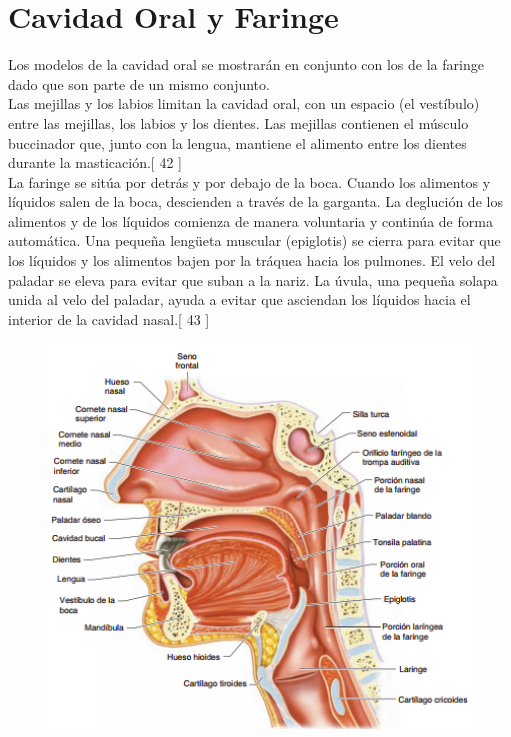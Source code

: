 \section{Cavidad Oral y Faringe}
Los modelos de la cavidad oral se mostrarán en conjunto con los de la faringe dado que son parte de un mismo conjunto.\\
Las mejillas y los labios limitan la cavidad oral, con un espacio (el vestíbulo) entre las mejillas, los labios y los dientes. Las mejillas contienen 
el músculo buccinador que, junto con la lengua, mantiene el alimento entre los dientes durante la masticación.[ 42 ]\\
La faringe se sitúa por detrás y por debajo de la boca. Cuando los alimentos y líquidos salen de la boca, descienden a través de la garganta. 
La deglución de los alimentos y de los líquidos comienza de manera voluntaria y continúa de forma automática. Una pequeña lengüeta muscular (epiglotis) 
se cierra para evitar que los líquidos y los alimentos bajen por la tráquea hacia los pulmones. El velo del paladar se eleva para evitar que suban a la nariz. 
La úvula, una pequeña solapa unida al velo del paladar, ayuda a evitar que asciendan los líquidos hacia el interior de la cavidad nasal.[ 43 ]\\
\begin{figure}[H]
	\begin{center}
 		\includegraphics[width = 1\textwidth]{v2/images/image84.png}
	\end{center} 
\end{figure}
